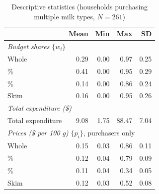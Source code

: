 \begin{table}[htbp]
\centering
\caption{Descriptive statistics (households purchasing multiple milk types, $N = 261$)}
\label{tab:summary_households}
\begin{tabular}{lrrrr}
\toprule
 & Mean & Min & Max & SD \\
\midrule
\multicolumn{5}{l}{\textit{Budget shares} $\{w_i\}$} \\
\quad Whole & 0.29 & 0.00 & 0.97 & 0.25 \\
\quad 2\% & 0.41 & 0.00 & 0.95 & 0.29 \\
\quad 1\% & 0.14 & 0.00 & 0.86 & 0.24 \\
\quad Skim & 0.16 & 0.00 & 0.95 & 0.26 \\
\midrule
\multicolumn{5}{l}{\textit{Total expenditure (\$)}} \\
\quad Total expenditure & 9.08 & 1.75 & 88.47 & 7.04 \\
\midrule
\multicolumn{5}{l}{\textit{Prices (\$ per 100 g)} $\{p_i\}$, purchasers only} \\
\quad Whole & 0.15 & 0.03 & 0.86 & 0.11 \\
\quad 2\% & 0.12 & 0.04 & 0.79 & 0.09 \\
\quad 1\% & 0.11 & 0.04 & 0.34 & 0.05 \\
\quad Skim & 0.12 & 0.03 & 0.52 & 0.08 \\
\bottomrule
\end{tabular}
\end{table}
